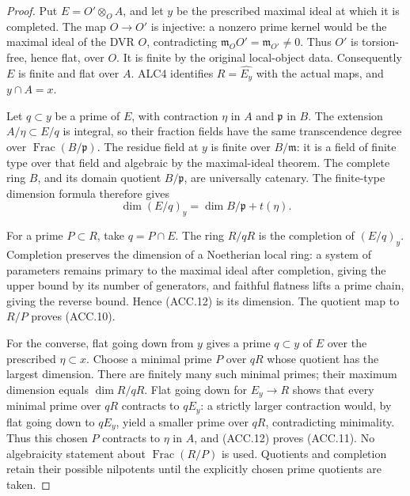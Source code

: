 \documentclass[11pt,a4paper]{article}
\numberwithin{equation}{section}
\theoremstyle{remark}\newtheorem{remark}[theorem]{Remark}
\begin{document}
\begin{proof}
Put \(E=O'\otimes_O A\), and let \(y\) be the prescribed
maximal ideal at which it is completed.  The map \(O\to O'\)
is injective: a nonzero prime kernel would be the maximal ideal of
the DVR \(O\), contradicting
\(\mathfrak m_O O'=\mathfrak m_{O'}\ne0\).  Thus \(O'\) is
torsion-free, hence flat, over \(O\).  It is finite by the original
local-object data.  Consequently \(E\) is finite and flat over
\(A\).  ALC4 identifies \(R=\widehat{E_y}\) with the actual
maps, and \(y\cap A=x\).

Let \(q\subset y\) be a prime of \(E\), with contraction
\(\eta\) in \(A\) and \(\mathfrak p\) in \(B\).
The extension \(A/\eta\subset E/q\) is integral, so their
fraction fields have the same transcendence degree over
\(\operatorname{Frac}(B/\mathfrak p)\).  The residue field at
\(y\) is finite over \(B/\mathfrak m\): it is a field of
finite type over that field and algebraic by the maximal-ideal
theorem.  The complete ring \(B\), and its domain quotient
\(B/\mathfrak p\), are universally catenary.  The finite-type
dimension formula therefore gives
\[
               \dim (E/q)_y=\dim B/\mathfrak p+t(\eta).
                                                               \tag{ACC.12}
\]

For a prime \(P\subset R\), take \(q=P\cap E\).
The ring \(R/qR\) is the completion of \((E/q)_y\).
Completion preserves the dimension of a Noetherian local ring:
a system of parameters remains primary to the maximal ideal after
completion, giving the upper bound by its number of generators,
and faithful flatness lifts a prime chain, giving the reverse bound.
Hence (ACC.12) is its dimension.  The quotient map to
\(R/P\) proves (ACC.10).

For the converse, flat going down from \(y\) gives a prime
\(q\subset y\) of \(E\) over the prescribed \(\eta\subset x\).
Choose a minimal prime \(P\) over \(qR\) whose quotient has the
largest dimension.  There are finitely many such minimal primes;
their maximum dimension equals \(\dim R/qR\).  Flat going down
for \(E_y\to R\) shows that every minimal prime over \(qR\)
contracts to \(qE_y\): a strictly larger contraction would, by
flat going down to \(qE_y\), yield a smaller prime over \(qR\),
contradicting minimality.  Thus this chosen \(P\)
contracts to \(\eta\) in \(A\), and (ACC.12) proves (ACC.11).
No algebraicity statement about \(\operatorname{Frac}(R/P)\) is
used.  Quotients and completion retain their possible nilpotents
until the explicitly chosen prime quotients are taken.
\end{proof}
\end{document}
